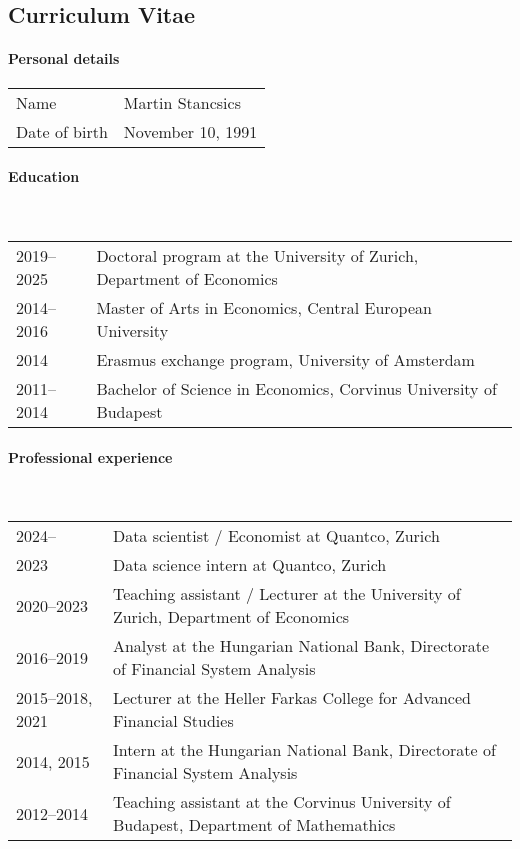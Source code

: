\begin{titlepage}

    \chapter*{Curriculum Vitae}
    
    \renewcommand{\arraystretch}{1.5}
    
    \subsubsection*{Personal details}
    \begin{tabular}{p{} p{}}
        Name & Martin Stancsics \\
        Date of birth & November 10, 1991
    \end{tabular}
    
    \subsubsection*{Education}\mbox{}\\
    \begin{tabular}{p{} p{}}
        2019--2025 & Doctoral program at the University of Zurich, Department of Economics \\
        2014--2016 & Master of Arts in Economics, Central European University \\
        2014 & Erasmus exchange program, University of Amsterdam \\
        2011--2014 & Bachelor of Science in Economics, Corvinus University of Budapest
    \end{tabular}
    
    \subsubsection*{Professional experience}\mbox{}\\
    \begin{tabular}{p{} p{}}
        2024-- & Data scientist / Economist at Quantco, Zurich \\
        2023 & Data science intern at Quantco, Zurich \\
        2020--2023 & Teaching assistant / Lecturer at the University of Zurich, Department of Economics \\
        2016--2019 & Analyst at the Hungarian National Bank, Directorate of Financial System Analysis \\
        2015--2018, 2021 & Lecturer at the Heller Farkas College for Advanced Financial Studies \\
        2014, 2015 & Intern at the Hungarian National Bank, Directorate of Financial System Analysis \\
        2012--2014 & Teaching assistant at the Corvinus University of Budapest, Department of Mathemathics
    \end{tabular}

    \thispagestyle{empty}

\end{titlepage}
